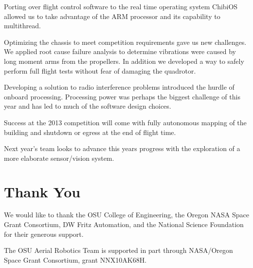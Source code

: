 \documentclass[12pt,letterpaper]{article} \usepackage[margin=1in]{geometry}
\begin{document}
Porting over flight control software to the real time operating system ChibiOS
allowed us to take advantage of the ARM processor and its capability to
multithread.

Optimizing the chassis to meet competition requirements gave us new challenges.
We applied root cause failure analysis to determine vibrations were caused by
long moment arms from the propellers. In addition we developed a way to safely
perform full flight tests without fear of damaging the quadrotor.

Developing a solution to radio interference problems introduced the hurdle of
onboard processing. Processing power was perhaps the biggest challenge of this
year and has led to much of the software design choices.

Success at the 2013 competition will come with fully autonomous mapping of the
building and shutdown or egress at the end of flight time.

Next year's team looks to advance this years progress with the exploration of
a more elaborate sensor/vision system.



\section*{Thank You}

We would like to thank the OSU College of Engineering, the Oregon NASA Space
Grant Consortium, DW Fritz Automation, and the National Science Foundation for
their generous support.

The OSU Aerial Robotics Team is supported in part through NASA/Oregon Space
Grant Consortium, grant NNX10AK68H.
\end{document}
